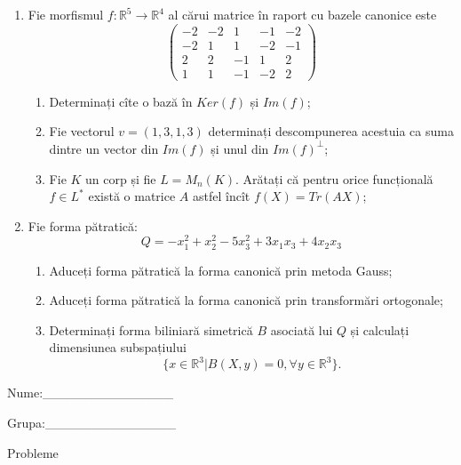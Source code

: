 \documentclass{article}
\begin{document}
\begin{enumerate}
 \item Fie morfismul $f:\mathbb{R}^5 \to \mathbb{R}^4$ al cărui matrice în raport cu bazele canonice este
$$\begin{pmatrix}
-2&-2&1&-1&-2\\
-2&1&1&-2&-1\\
2&2&-1&1&2\\
1&1&-1&-2&2
\end{pmatrix}$$

\begin{enumerate}
\item Determinați cîte o bază în $Ker(f)$ și $Im(f)$;
\item Fie vectorul $v=(1,3,1,3)$ determinați descompunerea acestuia ca suma dintre un vector din $Im(f)$ și unul din $Im(f)^\perp$;
\item Fie $K$ un corp și fie $L=M_n(K)$. Arătați că pentru orice funcțională $f \in L^*$ există o matrice $A$ astfel încît $f(X)=Tr(AX)$;
\end{enumerate}
\item Fie forma pătratică:
$$Q= -x_1^2+x_2^2-5x_3^2+3x_1x_3+4x_2x_3$$

\begin{enumerate}
\item Aduceți forma pătratică la forma canonică prin metoda Gauss;
\item Aduceți forma pătratică la forma canonică prin transformări ortogonale;
\item Determinați forma biliniară simetrică $B$ asociată lui $Q$ și calculați dimensiunea subspațiului
$$\{x \in \mathbb{R}^3 | B(X,y)=0,\forall y \in \mathbb{R}^3\}.$$

\end{enumerate}
\end{enumerate}
\newpage
\begin{flushright}
Nume:\_\_\_\_\_\_\_\_\_\_\_\_\_\_
 
 
Grupa:\_\_\_\_\_\_\_\_\_\_\_\_\_\_
\end{flushright}
\begin{center}
\vspace{2cm}
{\Large Probleme}
\vspace{2cm}
\end{center}
\end{document}
